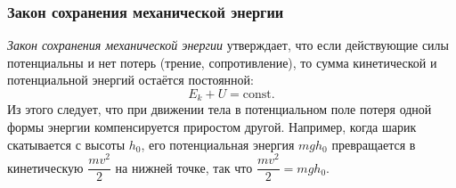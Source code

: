 \documentclass[12pt, a4paper]{article}%
\begin{document}
  
\subsubsection*{Закон сохранения механической энергии}

\textit{Закон сохранения механической энергии} утверждает, что если действующие силы потенциальны и нет потерь (трение, сопротивление), то сумма кинетической и потенциальной энергий остаётся постоянной:
\[
E_k + U = \text{const}.
\]
Из этого следует, что при движении тела в потенциальном поле потеря одной формы энергии компенсируется приростом другой. Например, когда шарик скатывается с высоты $h_0$, его потенциальная энергия $mgh_0$ превращается в кинетическую $\dfrac{mv^2}{2}$ на нижней точке, так что $\dfrac{m v^2}{2} = m g h_0$.
\end{document}
